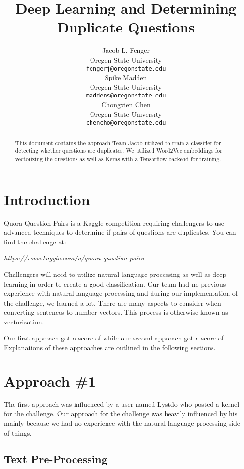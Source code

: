 \documentclass{article}
\title{Deep Learning and Determining Duplicate Questions}
\author{
  Jacob L. Fenger\\
  Oregon State University\\
  \texttt{fengerj@oregonstate.edu} \\
  \And
  Spike Madden \\
  Oregon State University\\
  \texttt{maddens@oregonstate.edu} \\
  \AND
  Chongxien Chen \\
  Oregon State University\\
  \texttt{chencho@oregonstate.edu} \\
}
\begin{document}

\maketitle

\begin{abstract}
  This document contains the approach Team Jacob utilized to train a classifier
  for detecting whether questions are duplicates. We utilized Word2Vec embeddings
  for vectorizing the questions as well as Keras with a Tensorflow backend
  for training.
\end{abstract}

\section{Introduction}

Quora Question Pairs is a Kaggle competition requiring challengers to use
advanced techniques to determine if pairs of questions are duplicates. You
can find the challenge at:
\begin{center}
\textit{https://www.kaggle.com/c/quora-question-pairs}
\end{center}

Challengers will need to utilize natural language processing as well as
deep learning in order to create a good classification. Our team had no
previous experience with natural language processing and during our
implementation of the challenge, we learned a lot. There are many aspects
to consider when converting sentences to number vectors. This process is
otherwise known as vectorization.

Our first approach got a score of  while our second approach got a score
of. Explanations of these approaches are outlined in the following
sections.

\section{Approach \#1}

The first approach was influenced by a user named Lystdo who posted a kernel
for the challenge. Our approach for the challenge was heavily influenced by
his mainly because we had no experience with the natural language processing
side of things.

\subsection{Text Pre-Processing}
\end{document}
